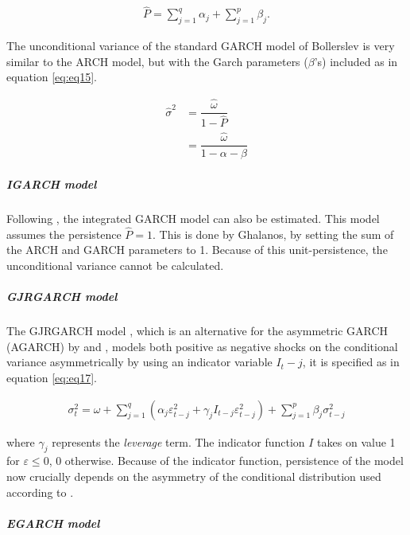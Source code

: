 \documentclass[a4paper, twoside]{templates/ociamthesis}
\begin{document}
\begin{align}
\hat{P} = \sum\limits_{j = 1}^q {{\alpha_j}}  + \sum\limits_{j = 1}^p {{\beta_j}}.
 \label{eq:eq14}
\end{align}

\noindent The unconditional variance of the standard GARCH model of Bollerslev is very similar to the ARCH model, but with the Garch parameters (\(\beta\)'s) included as in equation \eqref{eq:eq15}.

\begin{equation}
\begin{split}
\hat{\sigma}^2 
&= \dfrac{\hat{\omega}}{1 - \hat{P}} \\
&= \dfrac{\hat{\omega}}{1 - \alpha - \beta}
\end{split}
 \label{eq:eq15}
\end{equation}

\hypertarget{igarch-model}{%
\subparagraph{IGARCH model}\label{igarch-model}}

\noindent Following \textcite{ghalanos2020}, the integrated GARCH model \autocite{bollerslev1986} can also be estimated. This model assumes the persistence \(\hat{P} = 1\). This is done by Ghalanos, by setting the sum of the ARCH and GARCH parameters to 1. Because of this unit-persistence, the unconditional variance cannot be calculated.

\hypertarget{gjrgarch-model}{%
\subparagraph{GJRGARCH model}\label{gjrgarch-model}}

\noindent The GJRGARCH model \autocite{glosten1993}, which is an alternative for the asymmetric GARCH (AGARCH) by \textcite{engle1990} and \textcite{engle1993}, models both positive as negative shocks on the conditional variance asymmetrically by using an indicator variable \(I_t-j\), it is specified as in equation \eqref{eq:eq17}.

\begin{align}
\sigma_t^2 = \omega + \sum\limits_{j=1}^q (\alpha_j \varepsilon_{t-j}^2 + \gamma_j I_{t-j} \varepsilon_{t-j}^2) + \sum\limits_{j = 1}^p \beta_j \sigma_{t-j}^2
 \label{eq:eq17}
\end{align}

\noindent where \(\gamma_j\) represents the \emph{leverage} term. The indicator function \(I\) takes on value 1 for \(\varepsilon \le 0\), 0 otherwise. Because of the indicator function, persistence of the model now crucially depends on the asymmetry of the conditional distribution used according to \textcite{ghalanos2020}.

\hypertarget{egarch-model}{%
\subparagraph{EGARCH model}\label{egarch-model}}
\end{document}
